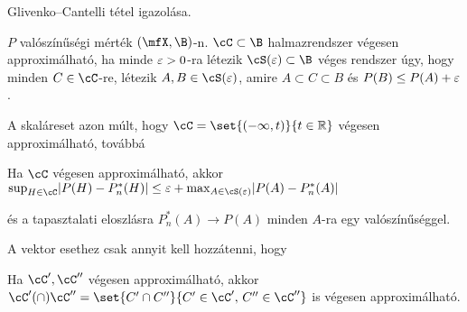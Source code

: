 \documentclass[aspectratio=169,notheorems,9pt,\option]{beamer}
\begin{document}
\begin{frame}{Glivenko--Cantelli tétel igazolása}.
  \begin{df}
    $P$ valószínűségi mérték $(\mfX ,\B)$-n.
    $\cC\subset\B$ halmazrendszer végesen approximálható, ha  minde $\varepsilon>0$-ra létezik
    $\cS (\eps)\subset\B$ véges rendszer úgy, hogy minden $C\in\cC$-re, 
    létezik $A,B\in\cS (\eps)$, amire $A\subset C\subset B$ és
    $P(B)\le  P(A)+\varepsilon$.
  \end{df}
  \continue
  A skaláreset azon múlt, hogy $\cC=\set{(-\infty,t)}{t\in\real}$ végesen approximálható, továbbá
  \begin{proposition}
    Ha $\cC$ végesen approximálható, akkor
      $\sup_{H\in\cC}\abs*{P (H)-P^*_n (H)}\leq
      \eps + \max_{A\in\cS (\eps)}  \abs*{P(A)-P^*_n (A)}$
  \end{proposition}
  és a tapasztalati eloszlásra $P_n^*(A)\to P(A)$ minden $A$-ra egy valószínűséggel.
  
  \continue
  A vektor esethez csak annyit kell hozzátenni, hogy
  \begin{proposition}
    Ha $\cC',\cC''$ végesen approximálható, akkor
     $\cC' (\cap)\cC''=\set{C'\cap C''}{C'\in\cC',\,C''\in\cC''}$ is végesen approximálható.
  \end{proposition}  
\end{frame}
\end{document}
